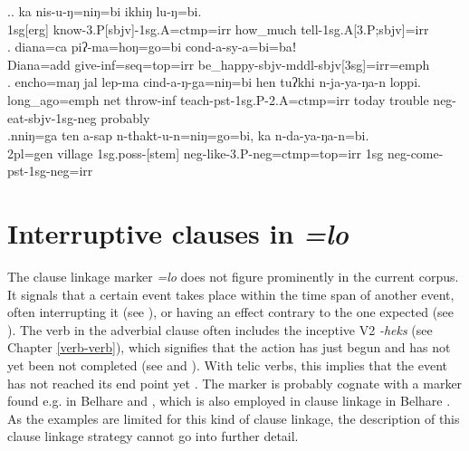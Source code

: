 \ex.\ag. ka nis-u-ŋ=niŋ=bi ikhiŋ lu-ŋ=bi.\\
	{\sc 1sg[erg]} 	know{\sc -3.P[sbjv]-1sg.A=ctmp=irr} how\_much tell{\sc -1sg.A[3.P;sbjv]=irr}\\
	 \bg. diana=ca  piʔ-ma=hoŋ=go=bi   cond-a-sy-a=bi=baǃ\\
	Diana{\sc =add} give{\sc -inf=seq=top=irr} be\_happy{\sc -sbjv-mddl-sbjv[3sg]=irr=emph}\\
	 
	\bg. encho=maŋ     jal lep-ma   cind-a-ŋ-ga=niŋ=bi     hen   tuʔkhi n-ja-ya-ŋa-n    loppi.\\
	long\_ago{\sc =emph} net throw{\sc -inf} teach{\sc -pst-1sg.P-2.A=ctmp=irr} today trouble {\sc neg-}eat{\sc -sbjv-1sg-neg} probably\\
	 
	\bg.nniŋ=ga ten a-sap n-thakt-u-n=niŋ=go=bi, ka n-da-ya-ŋa-n=bi.\\
	{\sc 2pl=gen} village {\sc 1sg.poss-[stem]} {\sc neg-}like{\sc -3.P-neg=ctmp=top=irr} {\sc 1sg} {\sc neg-}come{\sc -pst-1sg-neg=irr}\\

 

\section{Interruptive clauses in \emph{=lo}}\label{adv-cl-int}

The clause linkage marker \emph{=lo} does not figure prominently in the current corpus. It signals that a certain event takes place within the time span of another event, often interrupting it (see \Next[a]), or having an effect  contrary to the one expected (see \Next[b]). The verb in the adverbial clause often includes the inceptive V2 \emph{-heks} (see Chapter \ref{verb-verb}), which signifies that the action has just begun and has not yet been not completed (see \Next[a] and \Next[b]). With telic verbs, this implies that the event has not reached its end point yet \Next[c]. The marker is probably cognate with a  marker found e.g. in Belhare and , which is also employed in clause linkage in Belhare \citep{Bickel1993Belhare, Doornenbal2009A-grammar}. As the examples are limited for this kind of clause linkage, the description of this clause linkage strategy cannot go into further detail.

